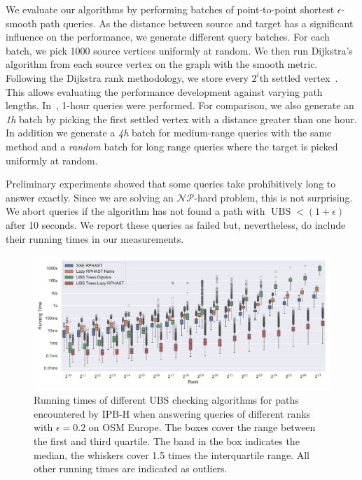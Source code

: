 \documentclass[a4paper,UKenglish,cleveref, autoref, thm-restate]{lipics-v2021}
\newcommand*{\ubs}{\operatorname{UBS}}
\begin{document}
We evaluate our algorithms by performing batches of point-to-point shortest $\epsilon$-smooth path queries.
As the distance between source and target has a significant influence on the performance, we generate different query batches.
For each batch, we pick 1000 source vertices uniformly at random.
We then run Dijkstra's algorithm from each source vertex on the graph with the smooth metric.
Following the Dijkstra rank methodology, we store every $2^i$th settled vertex~\cite{ss-hhhes-05}.
This allows evaluating the performance development against varying path lengths.
In~\cite{adgw-arrn-13}, 1-hour queries were performed.
For comparison, we also generate an \emph{1h} batch by picking the first settled vertex with a distance greater than one hour.
In addition we generate a \emph{4h} batch for medium-range queries with the same method and a \emph{random} batch for long range queries where the target is picked uniformly at random.

Preliminary experiments showed that some queries take prohibitively long to answer exactly.
Since we are solving an $\mathcal{NP}$-hard problem, this is not surprising.
We abort queries if the algorithm has not found a path with $\ubs < (1+\epsilon)$ after 10 seconds.
We report these queries as failed but, nevertheless, do include their running times in our measurements.

\begin{figure}
\centering
\includegraphics[width=\linewidth]{fig/ubs_perf.pdf}
\caption{
Running times of different UBS checking algorithms for paths encountered by IPB-H when answering queries of different ranks with $\epsilon = 0.2$ on OSM Europe.
The boxes cover the range between the first and third quartile.
The band in the box indicates the median, the whiskers cover 1.5 times the interquartile range.
All other running times are indicated as outliers.
}\label{fig:ubs_perf}
\end{figure}
\end{document}
